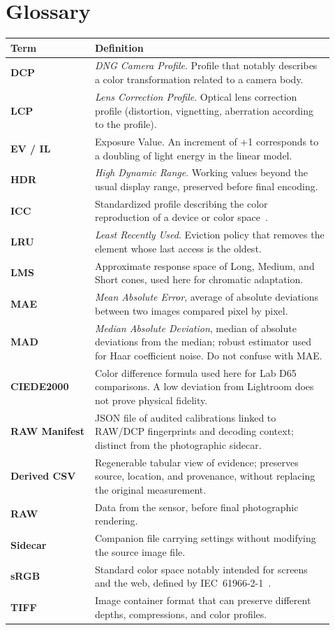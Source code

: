 \chapter{Glossary}
\label{chap:glossaire}

\begin{longtable}{p{0.24\linewidth}p{0.68\linewidth}}
\toprule
Term & Definition \\
\midrule
\endhead
\textbf{DCP} & \emph{DNG Camera Profile}. Profile that notably describes a color transformation related to a camera body. \\
\textbf{LCP} & \emph{Lens Correction Profile}. Optical lens correction profile (distortion, vignetting, aberration according to the profile). \\
\textbf{EV / IL} & Exposure Value. An increment of +1 corresponds to a doubling of light energy in the linear model. \\
\textbf{HDR} & \emph{High Dynamic Range}. Working values beyond the usual display range, preserved before final encoding. \\
\textbf{ICC} & Standardized profile describing the color reproduction of a device or color space~\cite{icc2022}. \\
\textbf{LRU} & \emph{Least Recently Used}. Eviction policy that removes the element whose last access is the oldest. \\
\textbf{LMS} & Approximate response space of Long, Medium, and Short cones, used here for chromatic adaptation. \\
\textbf{MAE} & \emph{Mean Absolute Error}, average of absolute deviations between two images compared pixel by pixel. \\
\textbf{MAD} & \emph{Median Absolute Deviation}, median of absolute deviations from the median; robust estimator used for Haar coefficient noise. Do not confuse with MAE. \\
\textbf{CIEDE2000} & Color difference formula used here for Lab D65 comparisons. A low deviation from Lightroom does not prove physical fidelity. \\
\textbf{RAW Manifest} & JSON file of audited calibrations linked to RAW/DCP fingerprints and decoding context; distinct from the photographic sidecar. \\
\textbf{Derived CSV} & Regenerable tabular view of evidence; preserves source, location, and provenance, without replacing the original measurement. \\
\textbf{RAW} & Data from the sensor, before final photographic rendering. \\
\textbf{Sidecar} & Companion file carrying settings without modifying the source image file. \\
\textbf{sRGB} & Standard color space notably intended for screens and the web, defined by IEC~61966-2-1~\cite{srgb}. \\
\textbf{TIFF} & Image container format that can preserve different depths, compressions, and color profiles. \\
\bottomrule
\end{longtable}
